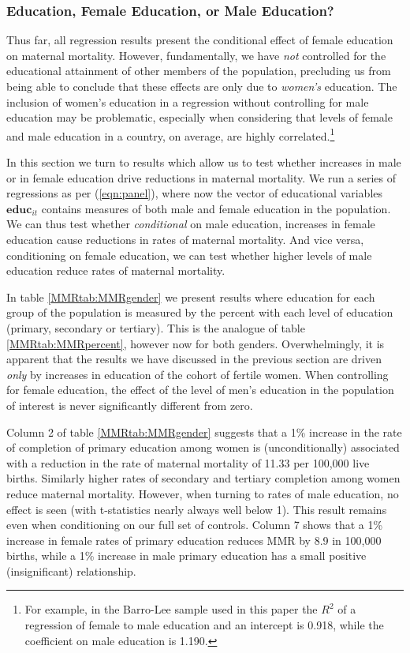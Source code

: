 \documentclass{article}[12pt,subeqn]
\begin{document}
\begin{spacing}{1.4}
\subsubsection{Education, Female Education, or Male Education?}
\label{ssscn:gender}
Thus far, all regression results present the conditional effect of female 
education on maternal mortality.  However, fundamentally, we have \emph{not} 
controlled for the educational attainment of other members of the population, 
precluding us from being able to conclude that these effects are only due to 
\emph{women's} education.  The inclusion of women's education in a regression 
without controlling for male education may be problematic, especially when 
considering that levels of female and male education in a country, on average, 
are highly correlated.\footnote{For example, in the Barro-Lee sample used in this 
paper the $R^2$ of a regression of female to male education and an intercept is 
0.918, while the coefficient on male education is 1.190.}

In this section we turn to results which allow us to test whether increases 
in male or in female education drive reductions in maternal mortality.  We
run a series of regressions as per (\ref{eqn:panel}), where now the vector
of educational variables $\mathbf{educ}_{it}$ contains measures of both male
and female education in the population.  We can thus test whether 
\emph{conditional} on male education, increases in female education cause
reductions in rates of maternal mortality.  And vice versa, conditioning on
female education, we can test whether higher levels of male education reduce
rates of maternal mortality.

In table \ref{MMRtab:MMRgender} we present results where education for each 
group of the population is measured by the percent with each level of 
education (primary, secondary or tertiary).  This is the analogue of table
\ref{MMRtab:MMRpercent}, however now for both genders.  Overwhelmingly, it is
apparent that the results we have discussed in the previous section are driven
\emph{only} by increases in education of the cohort of fertile women.  When
controlling for female education, the effect of the level of men's education in
the population of interest is never significantly different from zero.

Column 2 of table \ref{MMRtab:MMRgender} suggests that a 1\% increase in the
rate of completion of primary education among women is (unconditionally) 
associated with a reduction in the rate of maternal mortality of 11.33 per 
100,000 live births.  Similarly higher rates of secondary and tertiary 
completion among women reduce maternal mortality.  However, when turning to 
rates of male education, no effect is seen (with t-statistics nearly always
well below 1).  This result remains even when conditioning on our full set
of controls.  Column 7 shows that a 1\% increase in female rates of primary
education reduces MMR by 8.9 in 100,000 births, while a 1\% increase in male
primary education has a small positive (insignificant) relationship.


\end{spacing}
\end{document}
